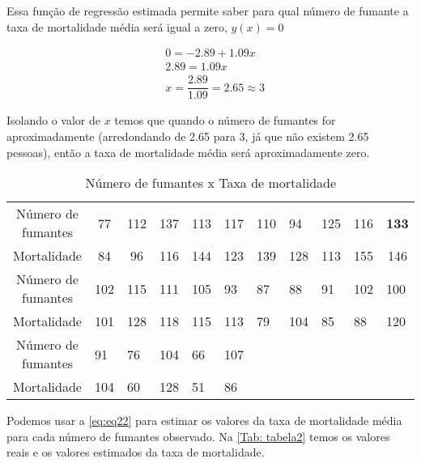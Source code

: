\noindent Essa função de regressão estimada permite saber para qual número de fumante a taxa de mortalidade média será igual a zero, $y(x) = 0$

\begin{align}
    & 0 = -2.89 + 1.09x \\
   & 2.89 = 1.09x \\
   & x = \dfrac{2.89}{1.09} = 2.65 \approx 3
\end{align}

\noindent Isolando o valor de $x$ temos que quando o número de fumantes for aproximadamente (arredondando de 2.65 para 3, já que não existem 2.65 pessoas), então a taxa de mortalidade média será aproximadamente zero.

\begin{table}[H]
\centering
\caption{Número de fumantes x Taxa de mortalidade}
\begin{tabular}{cllllllllll}
\hline
Número de fumantes & \multicolumn{1}{c}{77} & \multicolumn{1}{c}{112} & \multicolumn{1}{c}{137} & 113 & 117 & 110 & 94 & 125 & 116 & \multicolumn{1}{c}{\textbf{133}} \\
Mortalidade & \multicolumn{1}{c}{84} & \multicolumn{1}{c}{96} & \multicolumn{1}{c}{116} & 144 & 123 & 139 & 128 & 113 & 155 & \multicolumn{1}{c}{146} \\ \hline
Número de fumantes & 102 & 115 & 111 & 105 & 93 & 87 & 88 & 91 & 102 & 100 \\
Mortalidade & 101 & 128 & 118 & 115 & 113 & 79 & 104 & 85 & 88 & 120 \\ \hline
Número de fumantes & 91 & 76 & 104 & 66 & 107 &  &  &  &  &  \\
Mortalidade & 104 & 60 & 128 & 51 & 86 &  &  &  &  &  \\ \hline
\end{tabular}%
\label{Tab: tabela}
\end{table}

\noindent Podemos usar a \autoref{eq:eq22} para estimar os valores da taxa de mortalidade média para cada número de fumantes observado. Na \autoref{Tab: tabela2} temos os valores reais e os valores estimados da taxa de mortalidade.


